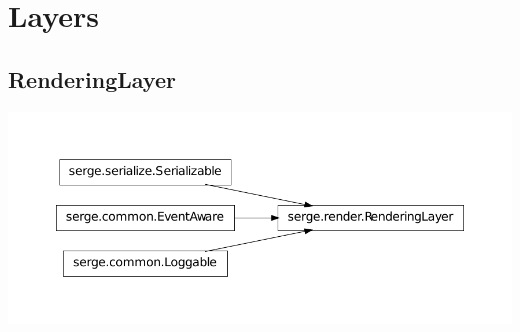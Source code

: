 \documentclass[letterpaper,10pt,english]{sphinxmanual}
\begin{document}
\section{Layers}
\label{renderering:layers}

\subsection{RenderingLayer}
\label{renderering:renderinglayer}
\includegraphics{inheritance-c5d556d35d5d19818ff096f6b93cea35199f7841.pdf}
\end{document}
